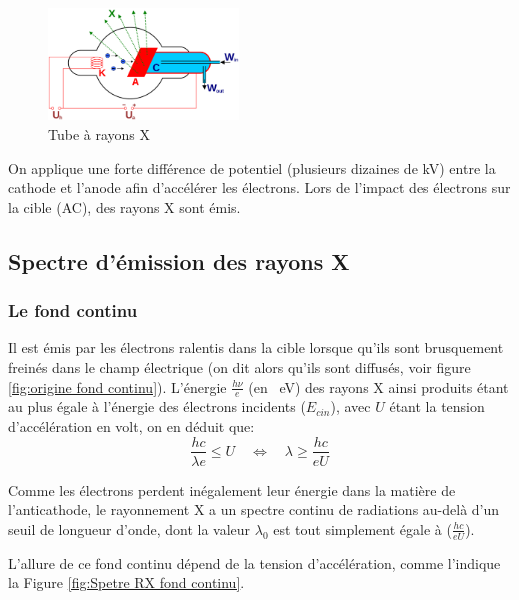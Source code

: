 \documentclass{article}
\begin{document}
\setlength{\intextsep}{0pt}
\begin{figure}
    \centering
    \vspace{-1cm}
    \includegraphics[width=0.45\textwidth]{Fig/tube-a-rayon-x.png} 
    \caption{Tube à rayons X}
    \label{fig:tube à rayons X}
\end{figure}
\vspace{1.5cm}
On applique une forte différence de potentiel (plusieurs dizaines de kV) 
entre la cathode et l'anode afin d'accélérer les électrons. Lors de l'impact des électrons sur la 
cible (AC), des rayons X sont émis.

\vspace{2cm}
\subsection{Spectre d'émission des rayons X}

\subsubsection{Le fond continu}

Il est émis par les électrons ralentis dans la cible lorsque qu'ils sont 
brusquement freinés dans le champ électrique (on dit alors qu'ils sont diffusés, voir figure \ref{fig:origine fond continu}). 
L'énergie $\frac{h\nu}{e}$ (en \qty{}{eV}) des rayons X ainsi produits étant au plus égale à l'énergie des 
électrons incidents ($E_{cin}$), avec $U$ étant la tension d'accélération en volt, on en déduit que:
$$\frac{hc}{\lambda e} \le U \quad \Longleftrightarrow \quad \lambda \ge \frac{hc}{eU}$$

Comme les électrons perdent inégalement leur énergie dans la matière de l'anticathode, 
le rayonnement X a un spectre continu de radiations au-delà d'un seuil de longueur d'onde, 
dont la valeur $\lambda_0$ est tout simplement égale à ($\frac{hc}{eU}$). 


L'allure de ce fond continu dépend de la tension d'accélération, comme l'indique la Figure \ref{fig:Spetre RX fond continu}.
\end{document}
